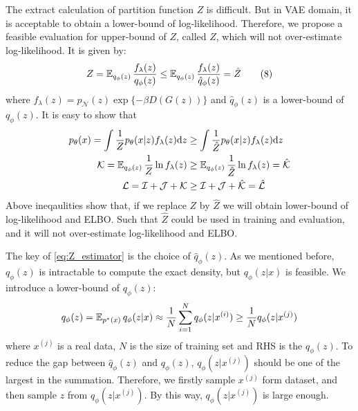 The extract calculation of partition function $Z$ is difficult. But in VAE domain, it is acceptable to obtain a lower-bound of log-likelihood. Therefore, we propose a feasible evaluation for upper-bound of $Z$, called $\hat{Z}$, which will not over-estimate log-likelihood. 
It is given by:
\begin{align*}\label{eq:Z_estimator}
	Z = \operatorname{\mathbb{E}}_{q_\phi(z)}\frac{f_\lambda(z)}{q_\phi(z)} \leq \operatorname{\mathbb{E}}_{q_\phi(z)} \frac{f_\lambda(z)}{\hat{q}_\phi(z)} = \hat{Z} \tag{8}
\end{align*}
where $f_\lambda(z) = p_\mathcal{N}(z) \exp\{- \beta D(G(z))\}$ and $\hat{q}_\phi(z)$ is a lower-bound of $q_\phi(z)$. It is easy to show that
\begin{align*}
	p_\theta(x) = \int \frac{1}{Z} p_\theta(x|z) f_\lambda(z) \mathrm{d} z &\geq \int \frac{1}{\hat{Z}} p_\theta(x|z) f_\lambda(z) \mathrm{d} z \\
\mathcal{K} = \operatorname{\mathbb{E}}_{q_\phi(z)} \frac{1}{Z} \ln f_\lambda(z) &\geq \operatorname{\mathbb{E}}_{q_\phi(z)} \frac{1}{\hat{Z}}\ln f_\lambda(z) = \mathcal{\hat{K}} \\
\mathcal{L} = \mathcal{I} + \mathcal{J} + \mathcal{K} &\geq \mathcal{I} + \mathcal{J} + \mathcal{\hat{K}} = \mathcal{\hat{L}}
\end{align*}
Above ineqaulities show that, if we replace $Z$ by $\hat{Z}$ we will obtain lower-bound of log-likelihood and ELBO. Such that $\hat{Z}$ could be used in training and evaluation, and it will not over-estimate log-likelihood and ELBO. 

The key of \cref{eq:Z_estimator} is the choice of $\hat{q}_\phi(z)$. As we mentioned before, $q_\phi(z)$ is intractable to compute the exact density, but $q_\phi(z|x)$ is feasible. We introduce a lower-bound of  $q_\phi(z)$:
\begin{equation*}
	q_\phi(z) = \operatorname{\mathbb{E}}_{p^*(x)} q_\phi(z|x) \approx \frac{1}{N}\sum_{i=1}^N q_\phi(z|x^{(i)}) \geq \frac{1}{N} q_\phi(z|x^{(j)})
\end{equation*}
where $x^{(j)}$ is a real data, $N$ is the size of training set and RHS is the $\hat{q}_\phi(z)$. To reduce the gap between $\hat{q}_\phi(z)$ and $q_\phi(z)$, $q_\phi(z|x^{(j)})$ should be one of the largest in the summation. Therefore, we firstly sample $x^{(j)}$ form dataset, and then sample $z$ from $q_\phi(z|x^{(j)})$. By this way, $q_\phi(z|x^{(j)})$ is  large enough. 

